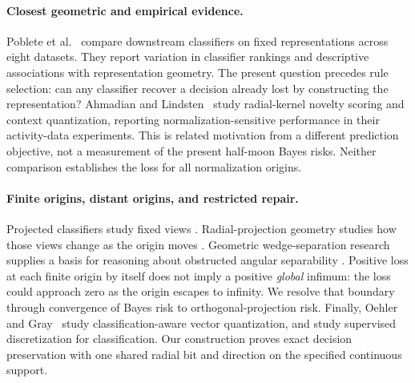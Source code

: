 {\paragraph{Closest geometric and empirical evidence.}
Poblete et al.~\citep{Poblete2026} compare downstream classifiers on fixed representations across eight datasets. They report variation in classifier rankings and descriptive associations with representation geometry. The present question precedes rule selection: can any classifier recover a decision already lost by constructing the representation? Ahmadian and Lindsten~\citep{Ahmadian2025} study radial-kernel novelty scoring and context quantization, reporting normalization-sensitive performance in their activity-data experiments. This is related motivation from a different prediction objective, not a measurement of the present half-moon Bayes risks. Neither comparison establishes the loss for all normalization origins.

\paragraph{Finite origins, distant origins, and restricted repair.}
Projected classifiers study fixed views \citep{Hamsici2007,Hamsici2008,Oh2025}. Radial-projection geometry studies how those views change as the origin moves \citep{Orponen2019}. Geometric wedge-separation research supplies a basis for reasoning about obstructed angular separability \citep{Hurtado2001}. Positive loss at each finite origin by itself does not imply a positive \emph{global} infimum: the loss could approach zero as the origin escapes to infinity. We resolve that boundary through convergence of Bayes risk to orthogonal-projection risk. Finally, Oehler and Gray~\citep{OehlerGray1995} study classification-aware vector quantization, and \citet{Senozan2024} study supervised discretization for classification. Our construction proves exact decision preservation with one shared radial bit and direction on the specified continuous support.
}

